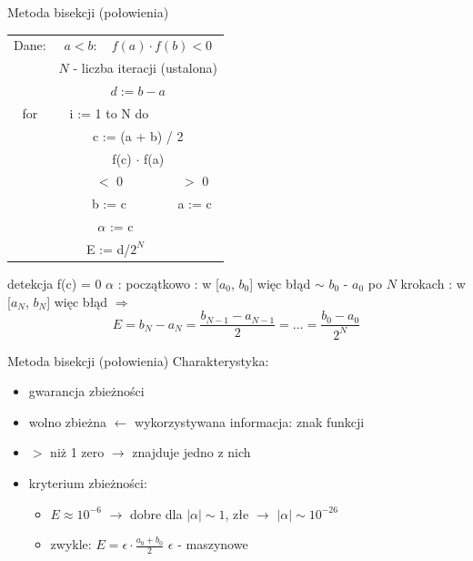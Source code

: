 \begin{frame}{Metoda bisekcji (połowienia)}
	\begin{table}[htbp]
		\begin{tabular}{|c|c|c|}
			\hline
			\multicolumn{1}{|c}{Dane:} & \multicolumn{2}{c|}{$a < b : \quad f(a) \cdot f(b) < 0$}\\
			\multicolumn{1}{|c}{} & \multicolumn{2}{c|}{$N$ - liczba iteracji (ustalona)}\\
			\multicolumn{1}{|c}{} & \multicolumn{2}{c|}{$d := b - a$}\\
			
			\hline
			
			\multicolumn{1}{|c}{\quad for} & \multicolumn{1}{c}{i := 1 to N do} & \text{}\\
			\cline{2-3}
			\multicolumn{1}{|c}{} & \multicolumn{2}{|c|}{c := (a + b) / 2}\\
			\cline{2-3}
			\multicolumn{1}{|c}{} & \multicolumn{2}{|c|}{f(c) $\cdot$ f(a)}\\
			\cline{2-3}
			\multicolumn{1}{|c|}{} & $<$ 0 & $>$ 0\\
			\multicolumn{1}{|c|}{} & b := c & a := c\\
			
			\hline
			
			\multicolumn{3}{|c|}{$\alpha$ := c}\\
			\multicolumn{3}{|c|}{E := d/$2^N$}\\
			\hline
		\end{tabular}
		\label{tab:transcap}
	\end{table}

	detekcja f(c) = 0\linebreak
	$\alpha$ : początkowo : w [$a_{0}$, $b_{0}$] więc błąd  $\sim$ $b_{0}$ - $a_{0}$\linebreak
	\phantom{x} \hspace{0.2cm} po $N$ krokach : w [$a_{N}$, $b_{N}$]  więc błąd $\Rightarrow$
	\[
		E = b_{N} - a_{N} = \frac{b_{N-1} - a_{N-1}}{2} = \ldots = \frac{b_{0} - a_{0}}{2^{N}}
	\]
\end{frame}
\begin{frame}{Metoda bisekcji (połowienia)}
	Charakterystyka:
	\begin{itemize}
		\item gwarancja zbieżności
		\item wolno zbieżna $\leftarrow$ wykorzystywana informacja: znak funkcji
		\item $>$ niż 1 zero $\rightarrow$ znajduje jedno z nich
		\item kryterium zbieżności:
		\begin{itemize}
			\item $E \approx 10^{-6}$ $\rightarrow$ dobre dla $\lvert\alpha\rvert \sim 1$, złe $\rightarrow$ $\lvert\alpha\rvert \sim 10^{-26}$
			\item zwykle: $E = \epsilon \cdot \frac{a_{0} + b_{0}}{2}$ \quad $\epsilon$ - maszynowe 
		\end{itemize}
	\end{itemize}
\end{frame}
